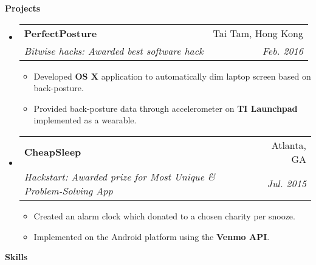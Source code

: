 \documentclass[letterpaper,10pt]{article}
\makeatletter
\newcommand{\resitem}[1]{\item #1 \vspace{-2pt}}
\newcommand{\resheading}[1]{{\large \colorbox{mygrey}{\begin{minipage}{\textwidth}{\textbf{#1 \vphantom{p\^{E}}}}\end{minipage}}}}
\newcommand{\ressubheading}[4]{
\begin{tabular*}{7.0in}{l@{\extracolsep{\fill}}r}
		\textbf{#1} & #2 \\
		\textit{#3} & \textit{#4} \\
\end{tabular*}\vspace{-6pt}}
\makeatother
\begin{document}
\resheading{Projects}
\begin{itemize}
\item
	\ressubheading{PerfectPosture}{Tai Tam, Hong Kong}{Bitwise hacks: Awarded best software hack}{Feb. 2016}
	\begin{itemize}
		\resitem{Developed \textbf{OS X} application to automatically dim laptop screen based on back-posture.}
		\resitem{Provided back-posture data through accelerometer on \textbf{TI Launchpad} implemented as a wearable.}
	\end{itemize}
\item
	\ressubheading{CheapSleep}{Atlanta, GA}{Hackstart: Awarded prize for Most Unique \& Problem-Solving App}{Jul. 2015}
	\begin{itemize}
		\resitem{Created an alarm clock which donated to a chosen charity per snooze.}
		\resitem{Implemented on the Android platform using the \textbf{Venmo API}.}
	\end{itemize}

\end{itemize}

\resheading{Skills}
\end{document}
